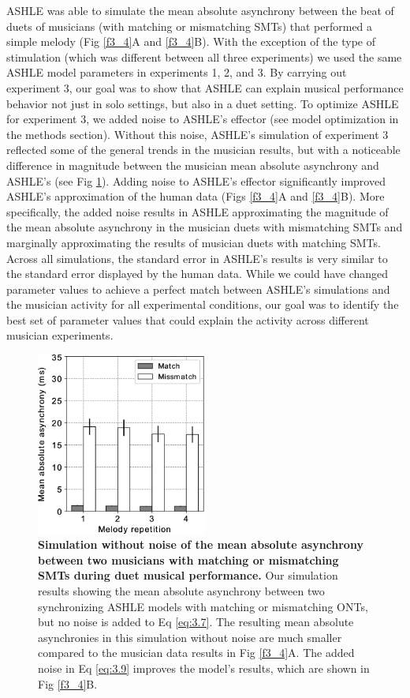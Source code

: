\documentclass{report}
\begin{document}
ASHLE was able to simulate the mean absolute asynchrony between the beat of duets of musicians (with matching or mismatching SMTs) that performed a simple melody (Fig \ref{f3_4}A and \ref{f3_4}B). With the exception of the type of stimulation (which was different between all three experiments) we used the same ASHLE model parameters in experiments 1, 2, and 3. By carrying out experiment 3, our goal was to show that ASHLE can explain musical performance behavior not just in solo settings, but also in a duet setting. To optimize ASHLE for experiment 3, we added noise to ASHLE's effector (see model optimization in the methods section). Without this noise, ASHLE's simulation of experiment 3 reflected some of the general trends in the musician results, but with a noticeable difference in magnitude between the musician mean absolute asynchrony and ASHLE's (see Fig \ref{f3_5}). Adding noise to ASHLE's effector significantly improved ASHLE's approximation of the human data (Figs \ref{f3_4}A and \ref{f3_4}B). More specifically, the added noise results in ASHLE approximating the magnitude of the mean absolute asynchrony in the musician duets with mismatching SMTs and marginally approximating the results of musician duets with matching SMTs. Across all simulations, the standard error in ASHLE's results is very similar to the standard error displayed by the human data. While we could have changed parameter values to achieve a perfect match between ASHLE's simulations and the musician activity for all experimental conditions, our goal was to identify the best set of parameter values that could explain the activity across different musician experiments.

\begin{figure}
    \centering
    \includegraphics[width=0.5\textwidth]{figures/fig3_5.png}
    \caption[Simulation without noise of the mean absolute asynchrony between two musicians with matching or mismatching SMTs during duet musical performance]{\textbf{Simulation without noise of the mean absolute asynchrony between two musicians with matching or mismatching SMTs during duet musical performance.} Our simulation results showing the mean absolute asynchrony between two synchronizing ASHLE models with matching or mismatching ONTs, but no noise is added to Eq \eqref{eq:3.7}. The resulting mean absolute asynchronies in this simulation without noise are much smaller compared to the musician data results in Fig \ref{f3_4}A. The added noise in Eq \eqref{eq:3.9} improves the model's results, which are shown in Fig \ref{f3_4}B.}
    \label{f3_5}
\end{figure}
\end{document}
